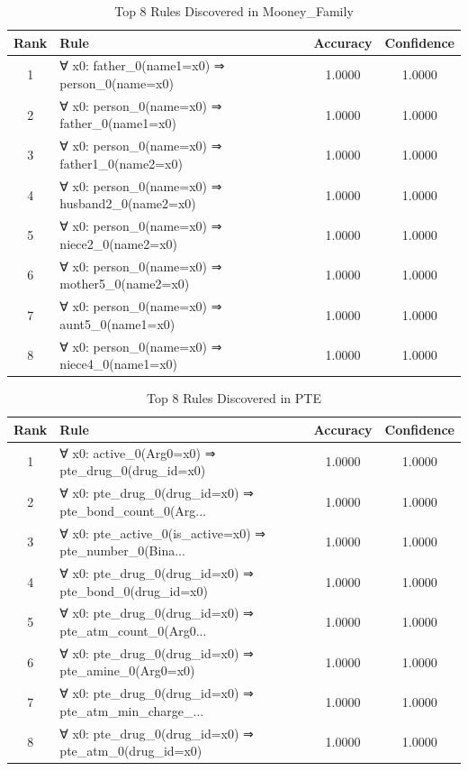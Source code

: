 \documentclass[11pt,a4paper]{article}
\begin{document}
\begin{table}[h!]
\centering
\small
\caption{Top 8 Rules Discovered in Mooney_Family}
\label{tab:rules_MooneyFamily}
\begin{tabular}{|c|p{5cm}|c|c|}
\hline
\textbf{Rank} & \textbf{Rule} & \textbf{Accuracy} & \textbf{Confidence} \\
\hline
1 & ∀ x0: father\_0(name1=x0) ⇒ person\_0(name=x0) & 1.0000 & 1.0000 \\
2 & ∀ x0: person\_0(name=x0) ⇒ father\_0(name1=x0) & 1.0000 & 1.0000 \\
3 & ∀ x0: person\_0(name=x0) ⇒ father1\_0(name2=x0) & 1.0000 & 1.0000 \\
4 & ∀ x0: person\_0(name=x0) ⇒ husband2\_0(name2=x0) & 1.0000 & 1.0000 \\
5 & ∀ x0: person\_0(name=x0) ⇒ niece2\_0(name2=x0) & 1.0000 & 1.0000 \\
6 & ∀ x0: person\_0(name=x0) ⇒ mother5\_0(name2=x0) & 1.0000 & 1.0000 \\
7 & ∀ x0: person\_0(name=x0) ⇒ aunt5\_0(name1=x0) & 1.0000 & 1.0000 \\
8 & ∀ x0: person\_0(name=x0) ⇒ niece4\_0(name1=x0) & 1.0000 & 1.0000 \\
\hline
\end{tabular}
\end{table}

\begin{table}[h!]
\centering
\small
\caption{Top 8 Rules Discovered in PTE}
\label{tab:rules_PTE}
\begin{tabular}{|c|p{5cm}|c|c|}
\hline
\textbf{Rank} & \textbf{Rule} & \textbf{Accuracy} & \textbf{Confidence} \\
\hline
1 & ∀ x0: active\_0(Arg0=x0) ⇒ pte\_drug\_0(drug\_id=x0) & 1.0000 & 1.0000 \\
2 & ∀ x0: pte\_drug\_0(drug\_id=x0) ⇒ pte\_bond\_count\_0(Arg... & 1.0000 & 1.0000 \\
3 & ∀ x0: pte\_active\_0(is\_active=x0) ⇒ pte\_number\_0(Bina... & 1.0000 & 1.0000 \\
4 & ∀ x0: pte\_drug\_0(drug\_id=x0) ⇒ pte\_bond\_0(drug\_id=x0) & 1.0000 & 1.0000 \\
5 & ∀ x0: pte\_drug\_0(drug\_id=x0) ⇒ pte\_atm\_count\_0(Arg0... & 1.0000 & 1.0000 \\
6 & ∀ x0: pte\_drug\_0(drug\_id=x0) ⇒ pte\_amine\_0(Arg0=x0) & 1.0000 & 1.0000 \\
7 & ∀ x0: pte\_drug\_0(drug\_id=x0) ⇒ pte\_atm\_min\_charge\_... & 1.0000 & 1.0000 \\
8 & ∀ x0: pte\_drug\_0(drug\_id=x0) ⇒ pte\_atm\_0(drug\_id=x0) & 1.0000 & 1.0000 \\
\hline
\end{tabular}
\end{table}
\end{document}
